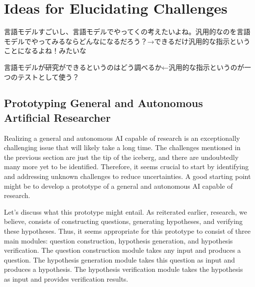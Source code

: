 

\section{Ideas for Elucidating Challenges}

言語モデルすごいし、言語モデルでやってくの考えたいよね。汎用的なのを言語モデルでやってみるならどんなになるだろう？→できるだけ汎用的な指示ということになるよね！みたいな

言語モデルが研究ができるというのはどう調べるか←汎用的な指示というのが一つのテストとして使う？

\subsection{Prototyping General and Autonomous Artificial Researcher}

Realizing a general and autonomous AI capable of research is an exceptionally challenging issue that will likely take a long time. The challenges mentioned in the previous section are just the tip of the iceberg, and there are undoubtedly many more yet to be identified. Therefore, it seems crucial to start by identifying and addressing unknown challenges to reduce uncertainties. A good starting point might be to develop a prototype of a general and autonomous AI capable of research.

Let's discuss what this prototype might entail. As reiterated earlier, research, we believe, consists of constructing questions, generating hypotheses, and verifying these hypotheses. Thus, it seems appropriate for this prototype to consist of three main modules: question construction, hypothesis generation, and hypothesis verification. The question construction module takes any input and produces a question. The hypothesis generation module takes this question as input and produces a hypothesis. The hypothesis verification module takes the hypothesis as input and provides verification results.

